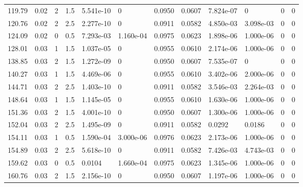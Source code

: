 \documentclass[preview]{standalone}
\begin{document}
{{\begin{tabular}{L{1.2cm}C{1.2cm} C{0.3cm}C{0.5cm} C{1.4cm}C{1.4cm} C{1.4cm}C{1.4cm} C{1.6cm}C{1.6cm} C{1.6cm}C{1.6cm}}
  119.79  &  0.02  & 2     & 1.5 &  5.541e-10  & 0  &  0.0950&   0.0607& 7.824e-07 & 0   &  0 & 0  \\ 
  120.76  &  0.02  & 2     & 2.5 &  2.277e-10  & 0  &  0.0911&   0.0582& 4.850e-03 & 3.098e-03   &  0 & 0  \\ 
  124.09  &  0.02  & 0     & 0.5 &  7.293e-03  & 1.160e-04  &  0.0975&   0.0623& 1.898e-06 & 1.000e-06   &  0 & 0  \\ 
  128.01  &  0.03  & 1     & 1.5 &  1.037e-05  & 0  &  0.0955&   0.0610& 2.174e-06 & 1.000e-06   &  0 & 0  \\ 
  138.85  &  0.03  & 2     & 1.5 &  1.272e-09  & 0  &  0.0950&   0.0607& 7.535e-07 & 0   &  0 & 0  \\ 
  140.27  &  0.03  & 1     & 1.5 &  4.469e-06  & 0  &  0.0955&   0.0610& 3.402e-06 & 2.000e-06   &  0 & 0  \\ 
  144.71  &  0.03  & 2     & 2.5 &  1.403e-10  & 0  &  0.0911&   0.0582& 3.546e-03 & 2.264e-03   &  0 & 0  \\ 
  148.64  &  0.03  & 1     & 1.5 &  1.145e-05  & 0  &  0.0955&   0.0610& 1.630e-06 & 1.000e-06   &  0 & 0  \\ 
  151.36  &  0.03  & 2     & 1.5 &  4.001e-10  & 0  &  0.0950&   0.0607& 1.300e-06 & 1.000e-06   &  0 & 0  \\ 
  152.04  &  0.03  & 2     & 2.5 &  1.495e-09  & 0  &  0.0911&   0.0582& 0.0292 & 0.0186   &  0 & 0  \\ 
  154.11  &  0.03  & 1     & 0.5 &  1.590e-04  & 3.000e-06  &  0.0976&   0.0623& 2.173e-06 & 1.000e-06   &  0 & 0  \\ 
  154.89  &  0.03  & 2     & 2.5 &  5.618e-10  & 0  &  0.0911&   0.0582& 7.426e-03 & 4.743e-03   &  0 & 0  \\ 
  159.62  &  0.03  & 0     & 0.5 &  0.0104  & 1.660e-04  &  0.0975&   0.0623& 1.345e-06 & 1.000e-06   &  0 & 0  \\ 
  160.76  &  0.03  & 2     & 1.5 &  2.156e-10  & 0  &  0.0950&   0.0607& 1.197e-06 & 1.000e-06   &  0 & 0  \\ 
\hline 
\end{tabular} 

}}
\end{document}
